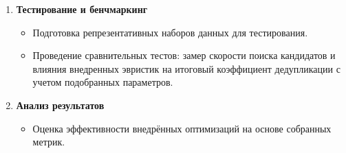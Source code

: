 \documentclass[a4paper,14pt]{extarticle}
\begin{document}
\begin{enumerate}
    \item \textbf{Тестирование и бенчмаркинг}
    \begin{itemize}
        \item Подготовка репрезентативных наборов данных для тестирования.
        \item Проведение сравнительных тестов: замер скорости поиска кандидатов и влияния внедренных эвристик на итоговый коэффициент дедупликации с учетом подобранных параметров.
    \end{itemize}
    
    \item \textbf{Анализ результатов}
    \begin{itemize}
        \item Оценка эффективности внедрённых оптимизаций на основе собранных метрик.
    \end{itemize}
\end{enumerate}
\end{document}
